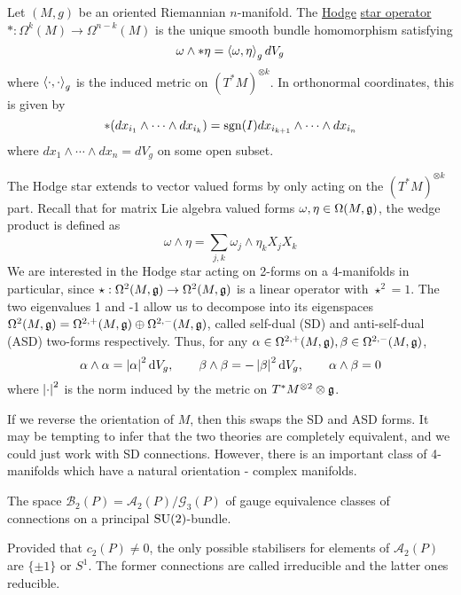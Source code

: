 \begin{defn}
	Let $(M,g)$ be an oriented Riemannian  $n$-manifold. The \underline{Hodge}
	\underline{star operator} $* : \Omega^k(M) \to \Omega^{n-k}(M)$ is the 
	unique smooth bundle homomorphism satisfying 
	\[
	\omega \wedge *\eta = \gen{\omega,\eta}_g dV_g
	\] 
	where $\gen{\cdot,\cdot}_g$ is the induced metric on $(T^*M)^{\otimes k}$.
	In orthonormal coordinates, this is given by
	\[
	*(dx_{i_1}\wedge \cdots\wedge dx_{i_k}) = \operatorname{sgn}(I)dx_{i_{k+1}}\wedge \cdots \wedge
	dx_{i_n} 
	\] 
	where $dx_1\wedge\cdots\wedge dx_n = dV_g$ on some open subset.
\end{defn}
The Hodge star extends to vector valued forms by only acting on the
$(T^*M)^{\otimes k}$ part. Recall that 
for matrix Lie algebra valued forms $\omega,\eta\in\Omega(M,\operatorname{\mathfrak{g}})$, the wedge 
product is defined as 
\begin{equation}
    \omega\wedge\eta = \sum_{j,k} \omega_j\wedge \eta_k X_j X_k 
\end{equation}
We are interested in the Hodge star acting on 2-forms on a 4-manifolds in
particular, since $\star : \Omega^2(M,\operatorname{\mathfrak{g}})\to\Omega^2(M,\operatorname{\mathfrak{g}})$ is a linear operator
with $\star^2= 1$. The two eigenvalues 1 and -1 allow us to decompose into its
eigenspaces $\Omega^2(M,\operatorname{\mathfrak{g}}) = \Omega^{2,+}(M,\operatorname{\mathfrak{g}}) \oplus \Omega^{2,-}(M,\operatorname{\mathfrak{g}})$,
called self-dual (SD) and anti-self-dual (ASD) two-forms respectively.
Thus, for any $\alpha \in \Omega^{2,+}(M,\operatorname{\mathfrak{g}}), \beta \in \Omega^{2,-}(M,\operatorname{\mathfrak{g}})$,
\begin{equation}
\alpha\wedge \alpha = \abs{\alpha}^2 \odif{V}_g, \qquad
\beta\wedge \beta = -\abs{\beta}^2 \odif{V}_g, \qquad
\alpha\wedge \beta = 0
\end{equation}
where $\abs{\cdot}^2$ is the norm induced by the metric on $T^*M^{\otimes
2}\otimes \operatorname{\mathfrak{g}}$.

If we reverse the orientation of $M$, then this swaps the SD and ASD forms. 
It may be tempting to infer that the two theories are completely
equivalent, and we could just work with SD connections. However, there is an
important class of 4-manifolds which have a natural orientation - complex
manifolds. 


The space $\mathcal{B}_2(P) = \mathcal{A}_2(P) / \mathcal{G}_3(P)$ of gauge
equivalence classes of connections on a principal $\operatorname{SU}(2)$-bundle. 

Provided that  $c_2(P)\neq 0$, the only possible stabilisers for elements of 
$\mathcal{A}_2(P)$ are $\{\pm 1\}$ or $S^1$. The former connections are called
irreducible and the latter ones reducible. 

